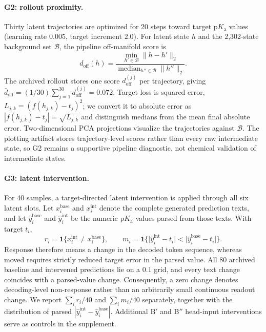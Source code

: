 \documentclass[11pt]{article}
\newcommand{\pka}{\mathrm{p}K_{\mathrm a}}
\begin{document}
\paragraph{G2: rollout proximity.} Thirty latent trajectories are optimized for 20 steps toward target $\pka$ values (learning rate $0.005$, target increment $2.0$). For latent state $h$ and the 2{,}302-state background set $\mathcal B$, the pipeline off-manifold score is
\begin{equation}
 d_{\mathrm{off}}(h)=\frac{\min_{h'\in\mathcal B}\lVert h-h'\rVert_2}
 {\operatorname{median}_{h''\in\mathcal B}\lVert h''\rVert_2}.
\end{equation}
The archived rollout stores one score $d_{\mathrm{off}}^{(j)}$ per trajectory, giving $\bar d_{\mathrm{off}}=(1/30)\sum_{j=1}^{30}d_{\mathrm{off}}^{(j)}=0.072$. Target loss is squared error, $L_{j,k}=(f(h_{j,k})-t_j)^2$; we convert it to absolute error as $|f(h_{j,k})-t_j|=\sqrt{L_{j,k}}$ and distinguish medians from the mean final absolute error. Two-dimensional PCA projections visualize the trajectories against $\mathcal B$. The plotting artifact stores trajectory-level scores rather than every raw intermediate state, so G2 remains a supportive pipeline diagnostic, not chemical validation of intermediate states.

\paragraph{G3: latent intervention.} For 40 samples, a target-directed latent intervention is applied through all six latent slots. Let $x_i^{\mathrm{base}}$ and $x_i^{\mathrm{int}}$ denote the complete generated prediction texts, and let $\hat y_i^{\mathrm{base}}$ and $\hat y_i^{\mathrm{int}}$ be the numeric $\pka$ values parsed from those texts. With target $t_i$,
\begin{equation}
 r_i=\mathbf 1\{x_i^{\mathrm{int}}\neq x_i^{\mathrm{base}}\},\qquad
 m_i=\mathbf 1\{\lvert\hat y_i^{\mathrm{int}}-t_i\rvert<\lvert\hat y_i^{\mathrm{base}}-t_i\rvert\}.
\end{equation}
Response therefore means a change in the decoded token sequence, whereas moved requires strictly reduced target error in the parsed value. All 80 archived baseline and intervened predictions lie on a $0.1$ grid, and every text change coincides with a parsed-value change. Consequently, a zero change denotes decoding-level non-response rather than an arbitrarily small continuous readout change. We report $\sum_i r_i/40$ and $\sum_i m_i/40$ separately, together with the distribution of parsed $|\hat y_i^{\mathrm{int}}-\hat y_i^{\mathrm{base}}|$. Additional B$'$ and B$''$ head-input interventions serve as controls in the supplement.
\end{document}
